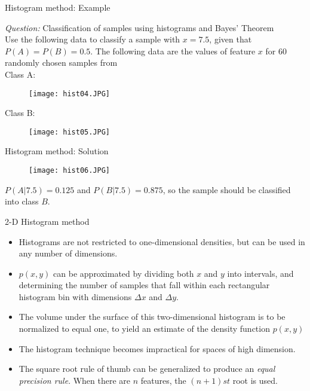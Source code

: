 \begin{frame}{Histogram method: Example}
\begin{footnotesize}
\textit{\color{mycolor1}Question:} Classification of samples using histograms and Bayes' Theorem\\
Use the following data to classify a sample with $x=7.5$, given that $P(A)=P(B)=0.5$. The following data are the values of feature $x$ for 60 randomly chosen samples from \\
Class A:
\begin{figure}
\texttt{[image: hist04.JPG]}
\end{figure}
Class B:
\begin{figure}
\texttt{[image: hist05.JPG]}
\end{figure}
\end{footnotesize}
\end{frame}

\begin{frame}{Histogram method: Solution}
\begin{figure}
\texttt{[image: hist06.JPG]}
\end{figure}
$P(A|7.5)=0.125$ and $P(B|7.5)=0.875$, so the sample should be classified into class $B$.
\end{frame}

\begin{frame}{2-D Histogram method}
\begin{itemize}
\item Histograms are not restricted to one-dimensional densities, but can be used in any number of dimensions.
\item $p(x,y)$ can be approximated by dividing both $x$ and $y$ into intervals, and determining the number of samples that fall within each rectangular histogram bin with dimensions $\Delta x$ and $\Delta y$.
\item The volume under the surface of this two-dimensional histogram is to be normalized to equal one, to yield an estimate of the density function $p(x,y)$
\item The histogram technique becomes impractical for spaces of high dimension.
\item The square root rule of thumb can be generalized to produce an \textit{\color{mycolor1}equal precision rule}. When there are $n$ features, the $(n+1)st$ root is used.
\end{itemize}
\end{frame}

